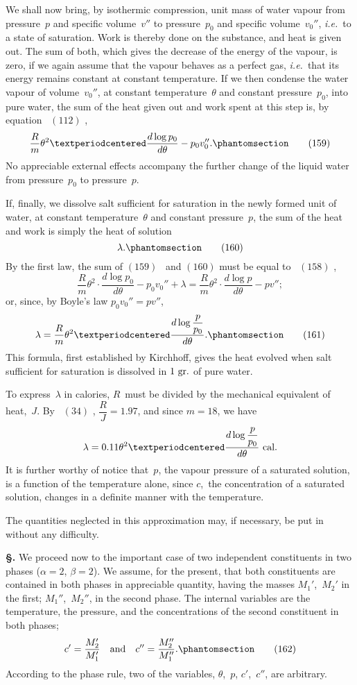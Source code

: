 \documentclass[12pt]{book}[2005/09/16]
\newcommand{\Chg}[2]{#2}
\newcommand{\Add}[1]{\Chg{}{#1}}
\newcommand{\Erratum}[2]{#2}
\newcommand{\Section}[1]{
  \medskip\par\textbf{§\;#1}
  \label{section:#1}
}
\newcommand{\Tag}[1]{%
  \phantomsection\label{eqn:#1}\tag*{\ensuremath{#1}}%
}
\newcommand{\Eq}[1]{%
  \hyperref[eqn:#1]{\ensuremath{#1}}%
}
\newcommand{\PageSep}[1]{\ignorespaces}
\newcommand{\ie}{\emph{i.e.}}
\newcommand{\Unit}[1]{\text{\upshape #1}}
\begin{document}
We shall now bring, by isothermic compression, unit
mass of water vapour from pressure~$p$ and specific volume~$v''$
to pressure~$p_{0}$ and specific volume~$v_{0}''$, \ie\ to a state of saturation.
Work is thereby done on the substance, and heat
is given out. The sum of both, which gives the decrease of
the energy of the vapour, is zero, if we again assume that
the vapour behaves as a perfect gas, \ie\ that its energy
remains constant at constant temperature. If we then
condense the water vapour of volume~$v_{0}''$, at constant temperature~$\theta$
and constant pressure~$p_{0}$, into pure water, the sum
of the heat given out and work spent at this step is, by
equation~\Eq{(112)},
\[
\frac{R}{m} \theta^{2} · \frac{d \log p_{0}}{d\theta} - p_{0} v_{0}''.
\Tag{(159)}
\]
No appreciable external effects accompany the further
change of the liquid water from pressure~$p_{0}$ to pressure~$p$.

If, finally, we dissolve salt sufficient for saturation in the
newly formed unit of water, at constant temperature~$\theta$ and
constant pressure~$p$, the sum of the heat and work is simply
the heat of solution
\[
\lambda\Add{.}
\Tag{(160)}
\]
\PageSep{191}
By the first law, the sum of \Eq{(159)}~and \Eq{(160)} must be equal
to~\Eq{(158)},
\[
\frac{R}{m} \theta^{2} · \frac{\Erratum{d \log p}{d \log p_{0}}}{d\theta} - p_{0} v_{0}'' + \lambda
  = \frac{R}{m} \theta^{2} · \frac{d \log p}{d\theta} - pv'';
\]
or, since, by Boyle's law $p_{0} v_{0}'' = pv''$,
\[
\lambda = \frac{R}{m} \theta^{2} · \frac{d \log \dfrac{p}{p_{0}}}{d\theta}.
\Tag{(161)}
\]
This formula, first established by Kirchhoff, gives the heat
%
evolved when salt sufficient for saturation is dissolved in
$1~\Unit{gr.}$ of pure water.

To express~$\lambda$ in calories, $R$~must be divided by the
mechanical equivalent of heat,~$J$\@. By~\Eq{(34)}, $\dfrac{R}{J} = 1.97$, and
since $m = 18$, we have
\[
\lambda = 0.11 \theta^{2} · \frac{d \log \dfrac{p}{p_{0}}}{d\theta}~\Unit{cal}.
\]
It is further worthy of notice that~$p$, the vapour pressure
of a saturated solution, is a function of the temperature
alone, since $c$,~the concentration of a saturated solution,
changes in a definite manner with the temperature.

The quantities neglected in this approximation may, if
necessary, be put in without any difficulty.

\Section{216.} We proceed now to the important case of two
independent constituents in two phases ($\alpha = 2$, $\beta = 2$).
We assume, for the present, that both constituents are contained
in both phases in appreciable quantity, having the
masses $M_{1}'$,~$M_{2}'$ in the first; $M_{1}''$,~$M_{2}''$, in the second phase.
The internal variables are the temperature, the pressure,
\PageSep{192}
and the concentrations of the second constituent in both
phases;
\[
c' = \frac{M_{2}'}{M_{1}'}
\quad\text{and}\quad
c'' = \frac{M_{2}''}{M_{1}''}.
\Tag{(162)}
\]
According to the phase rule, two of the variables, $\theta$,~$p$, $c'$,~$c''$,
are arbitrary.
\end{document}
